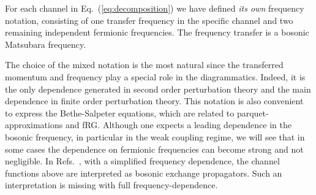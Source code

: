 For each channel in Eq.~(\ref{eq:decomposition}) we have defined \textit{its own} frequency notation, consisting of one transfer frequency in the specific channel 
and two remaining independent fermionic frequencies. 
The frequency transfer is a bosonic Matsubara frequency.
 
 The choice of the mixed notation is the most natural since the transferred momentum and 
frequency play a special role in the diagrammatics.
Indeed, it is the only dependence generated in second order perturbation theory and the main dependence in finite 
order perturbation theory. This notation is also convenient to express the Bethe-Salpeter equations, which are related to parquet-approximations and fRG.
Although one expects a leading dependence in the bosonic frequency, 
in particular in the weak coupling regime, we will see that in some cases the dependence on fermionic frequencies can become strong and not negligible.
In Refs.~, with a simplified frequency dependence, the channel functions above are interpreted as bosonic exchange propagators. Such an interpretation is missing with full frequency-dependence.

